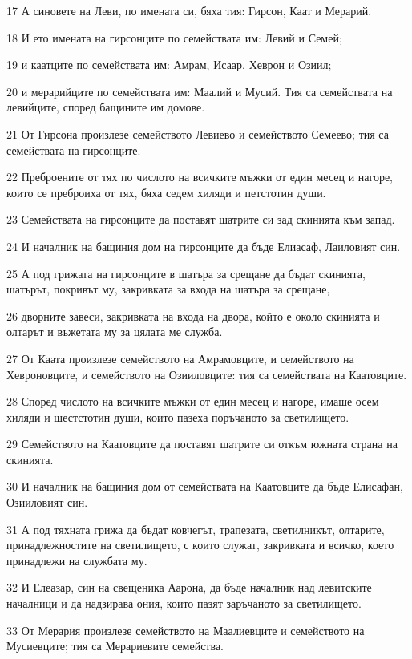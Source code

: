 \par 17 А синовете на Леви, по имената си, бяха тия: Гирсон, Каат и Мерарий.
\par 18 И ето имената на гирсонците по семействата им: Левий и Семей;
\par 19 и каатците по семействата им: Амрам, Исаар, Хеврон и Озиил;
\par 20 и мерарийците по семействата им: Маалий и Мусий. Тия са семействата на левийците, според бащините им домове.
\par 21 От Гирсона произлезе семейството Левиево и семейството Семеево; тия са семействата на гирсонците.
\par 22 Преброените от тях по числото на всичките мъжки от един месец и нагоре, които се преброиха от тях, бяха седем хиляди и петстотин души.
\par 23 Семействата на гирсонците да поставят шатрите си зад скинията към запад.
\par 24 И началник на бащиния дом на гирсонците да бъде Елиасаф, Лаиловият син.
\par 25 А под грижата на гирсонците в шатъра за срещане да бъдат скинията, шатърът, покривът му, закривката за входа на шатъра за срещане,
\par 26 дворните завеси, закривката на входа на двора, който е около скинията и олтарът и въжетата му за цялата ме служба.
\par 27 От Каата произлезе семейството на Амрамовците, и семейството на Хевроновците, и семейството на Озииловците: тия са семействата на Каатовците.
\par 28 Според числото на всичките мъжки от един месец и нагоре, имаше осем хиляди и шестстотин души, които пазеха поръчаното за светилището.
\par 29 Семейството на Каатовците да поставят шатрите си откъм южната страна на скинията.
\par 30 И началник на бащиния дом от семействата на Каатовците да бъде Елисафан, Озииловият син.
\par 31 А под тяхната грижа да бъдат ковчегът, трапезата, светилникът, олтарите, принадлежностите на светилището, с които служат, закривката и всичко, което принадлежи на службата му.
\par 32 И Елеазар, син на свещеника Аарона, да бъде началник над левитските началници и да надзирава ония, които пазят заръчаното за светилището.
\par 33 От Мерария произлезе семейството на Маалиевците и семейството на Мусиевците; тия са Мерариевите семейства.
